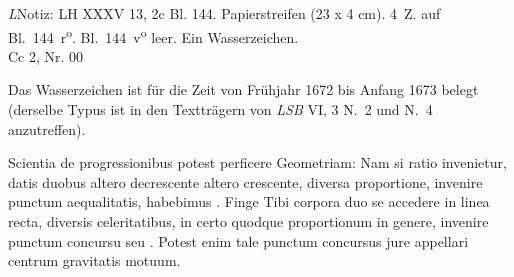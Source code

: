       
                \begin{Ueberlieferung}%
               {\textit{L}}Notiz: LH XXXV 13, 2c Bl. 144. Papierstreifen (23 x 4 cm). 4\, Z. auf Bl.~144~r\textsuperscript{o}. Bl.~144~v\textsuperscript{o} leer. Ein
Wasserzeichen.\\Cc 2, Nr. 00
\end{Ueberlieferung}
\begin{Datierungsgruende}%
Das Wasserzeichen ist für die Zeit von Frühjahr 1672 bis Anfang 1673 belegt (derselbe Typus ist in den Textträgern von \textit{LSB} VI, 3 N.~2 und N.~4 anzutreffen).
                \end{Datierungsgruende}
\pstartfirst
            [144~r\textsuperscript{o}] Scientia de progressionibus potest perficere Geometriam: Nam si ratio invenietur, datis duobus altero decrescente altero crescente, diversa proportione, invenire punctum aequalitatis, habebimus . Finge Tibi corpora duo se accedere in linea recta, diversis celeritatibus, in certo quodque  proportionum in genere, invenire punctum concursu seu \protect{}. Potest enim tale punctum concursus\protect{} jure appellari centrum gravitatis motuum.\pend 
 


 

